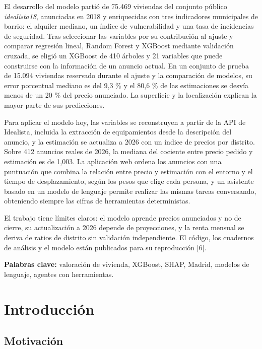 \documentclass[11pt,a4paper]{article}
\begin{document}
El desarrollo del modelo partió de 75.469 viviendas del conjunto público \emph{idealista18}, anunciadas en 2018 y enriquecidas con tres indicadores municipales de barrio: el alquiler mediano, un índice de vulnerabilidad y una tasa de incidencias de seguridad. Tras seleccionar las variables por su contribución al ajuste y comparar regresión lineal, Random Forest y XGBoost mediante validación cruzada, se eligió un XGBoost de 410 árboles y 21 variables que puede construirse con la información de un anuncio actual. En un conjunto de prueba de 15.094 viviendas reservado durante el ajuste y la comparación de modelos, su error porcentual mediano es del 9,3 \% y el 80,6 \% de las estimaciones se desvía menos de un 20 \% del precio anunciado. La superficie y la localización explican la mayor parte de sus predicciones.

Para aplicar el modelo hoy, las variables se reconstruyen a partir de la API de Idealista, incluida la extracción de equipamientos desde la descripción del anuncio, y la estimación se actualiza a 2026 con un índice de precios por distrito. Sobre 412 anuncios reales de 2026, la mediana del cociente entre precio pedido y estimación es de 1,003. La aplicación web ordena los anuncios con una puntuación que combina la relación entre precio y estimación con el entorno y el tiempo de desplazamiento, según los pesos que elige cada persona, y un asistente basado en un modelo de lenguaje permite realizar las mismas tareas conversando, obteniendo siempre las cifras de herramientas deterministas.

El trabajo tiene límites claros: el modelo aprende precios anunciados y no de cierre, su actualización a 2026 depende de proyecciones, y la renta mensual se deriva de ratios de distrito sin validación independiente. El código, los cuadernos de análisis y el modelo están publicados para su reproducción [6].

\textbf{Palabras clave:} valoración de vivienda, XGBoost, SHAP, Madrid, modelos de lenguaje, agentes con herramientas.

\section{Introducción}

\subsection{Motivación}
\end{document}

